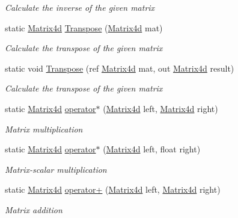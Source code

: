 \begin{DoxyCompactItemize}
\begin{DoxyCompactList}\small\item\em Calculate the inverse of the given matrix \end{DoxyCompactList}\item 
static \hyperlink{struct_open_t_k_1_1_matrix4d}{Matrix4d} \hyperlink{struct_open_t_k_1_1_matrix4d_a9c09fcda450502e888be9143b2f00f2e}{Transpose} (\hyperlink{struct_open_t_k_1_1_matrix4d}{Matrix4d} mat)
\begin{DoxyCompactList}\small\item\em Calculate the transpose of the given matrix \end{DoxyCompactList}\item 
static void \hyperlink{struct_open_t_k_1_1_matrix4d_a3d866552640a34ecb902b18f0f3713b5}{Transpose} (ref \hyperlink{struct_open_t_k_1_1_matrix4d}{Matrix4d} mat, out \hyperlink{struct_open_t_k_1_1_matrix4d}{Matrix4d} result)
\begin{DoxyCompactList}\small\item\em Calculate the transpose of the given matrix \end{DoxyCompactList}\item 
static \hyperlink{struct_open_t_k_1_1_matrix4d}{Matrix4d} \hyperlink{struct_open_t_k_1_1_matrix4d_ae87ad3f756bf85bdfad9fc1f9945f485}{operator$\ast$} (\hyperlink{struct_open_t_k_1_1_matrix4d}{Matrix4d} left, \hyperlink{struct_open_t_k_1_1_matrix4d}{Matrix4d} right)
\begin{DoxyCompactList}\small\item\em Matrix multiplication \end{DoxyCompactList}\item 
static \hyperlink{struct_open_t_k_1_1_matrix4d}{Matrix4d} \hyperlink{struct_open_t_k_1_1_matrix4d_ac36c42aad038b4c85d1ea81bdeb291f9}{operator$\ast$} (\hyperlink{struct_open_t_k_1_1_matrix4d}{Matrix4d} left, float right)
\begin{DoxyCompactList}\small\item\em Matrix-\/scalar multiplication \end{DoxyCompactList}\item 
static \hyperlink{struct_open_t_k_1_1_matrix4d}{Matrix4d} \hyperlink{struct_open_t_k_1_1_matrix4d_aebfa33f655961c5302a8c7d60b44d716}{operator+} (\hyperlink{struct_open_t_k_1_1_matrix4d}{Matrix4d} left, \hyperlink{struct_open_t_k_1_1_matrix4d}{Matrix4d} right)
\begin{DoxyCompactList}\small\item\em Matrix addition \end{DoxyCompactList}\item 

\end{DoxyCompactItemize}
